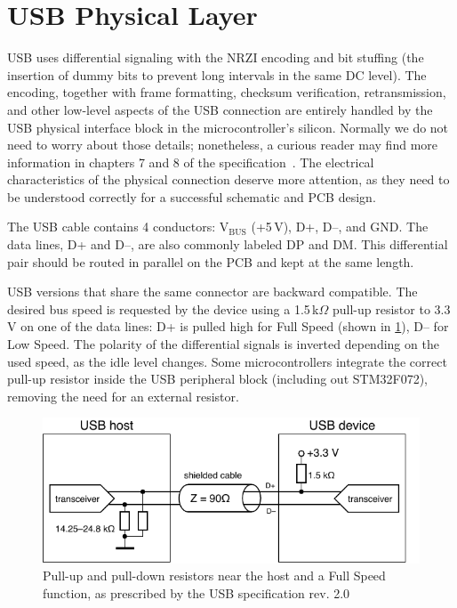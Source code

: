 \newpage


\section{USB Physical Layer}

\gls{USB} uses differential signaling with the \gls{NRZI} encoding and bit stuffing (the insertion of dummy bits to prevent long intervals in the same \gls{DC} level). The encoding, together with frame formatting, checksum verification, retransmission, and other low-level aspects of the \gls{USB} connection are entirely handled by the \gls{USB} physical interface block in the microcontroller's silicon. Normally we do not need to worry about those details; nonetheless, a curious reader may find more information in chapters 7 and 8 of the specification~\cite{usbif-spec}. The electrical characteristics of the physical connection deserve more attention, as they need to be understood correctly for a successful schematic and \gls{PCB} design.

The \gls{USB} cable contains 4 conductors: V$_\mathrm{BUS}$ (+5\,V), D+, D--, and \gls{GND}. The data lines, D+ and D--, are also commonly labeled DP and DM. This differential pair should be routed in parallel on the \gls{PCB} and kept at the same length.

\gls{USB} versions that share the same connector are backward compatible. The desired bus speed is requested by the device using a 1.5\,k$\Omega$ pull-up resistor to 3.3\,V on one of the data lines: D+ is pulled high for Full Speed (shown in \cref{fig:usb_pullup_fs}), D-- for Low Speed. The polarity of the differential signals is inverted depending on the used speed, as the idle level changes. Some microcontrollers integrate the correct pull-up resistor inside the \gls{USB} peripheral block (including out STM32F072), removing the need for an external resistor.

\begin{figure}[h]
	\centering
	\includegraphics[scale=1]{img/usb-resistors.pdf}
	\caption[USB pull-ups]{\label{fig:usb_pullup_fs}Pull-up and pull-down resistors near the host and a Full Speed function, as prescribed by the USB specification rev. 2.0}
\end{figure}

